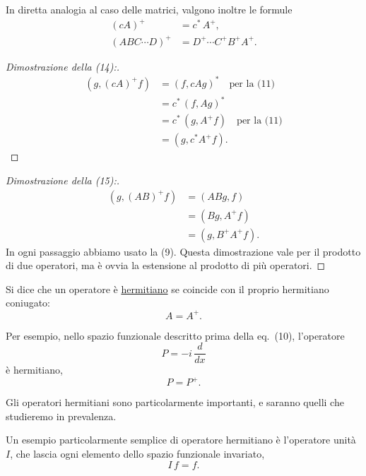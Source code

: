 \documentclass[11pt, a4paper]{book}
\numberwithin{equation}{section}
\begin{document}
In diretta analogia al caso delle matrici, valgono inoltre le formule
\begin{align}
(cA)^+ &= c^*\,A^+, \tag{14} \\
(ABC\cdots D)^+ &= D^+\cdots C^+B^+A^+. \tag{15}
\end{align}

\begin{proof}[Dimostrazione della (14):]
\begin{align*}
(g, (cA)^+f) &= (f, cAg)^* \quad \text{per la (11)} \\
  &= c^*\,(f, Ag)^* \\
  &= c^*\,(g, A^+f) \quad \text{per la (11)} \\
  &= (g, c^*A^+f).
\end{align*}
\end{proof}


\begin{proof}[Dimostrazione della (15):]
\begin{align*}
(g, (AB)^+f) &= (ABg, f) \\
  &= (Bg, A^+f) \\
  &= (g, B^+A^+f).
\end{align*}
In ogni passaggio abbiamo usato la (9). Questa dimostrazione vale per il
prodotto di due operatori, ma è ovvia la estensione al prodotto di più
operatori.
\end{proof}

Si dice che un operatore è \uline{hermitiano} se coincide con il
proprio hermitiano coniugato:
\begin{equation}
A = A^+.
\end{equation}

Per esempio, nello spazio funzionale descritto prima della eq.\ (10),
l'operatore
\begin{equation}
P = -i\,\frac{d}{dx}
\end{equation}
è hermitiano,
\begin{equation}
P = P^+.
\end{equation}

Gli operatori hermitiani sono particolarmente importanti, e saranno
quelli che studieremo in prevalenza.

Un esempio particolarmente semplice di operatore hermitiano è
l'operatore unità $I$, che lascia ogni elemento dello spazio funzionale
invariato,
\begin{equation}
I\,f = f.
\end{equation}
\end{document}
